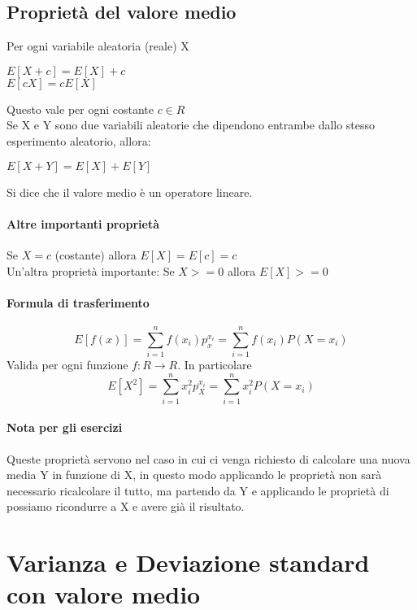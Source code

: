 \subsection{Proprietà del valore medio}
Per ogni variabile aleatoria (reale) X
\begin{center}
    $E[X + c] = E[X] + c$
    \\$E[cX] = c E[X]$
\end{center}
Questo vale per ogni costante $c \in R$
\\ Se X e Y sono due variabili aleatorie che dipendono entrambe dallo
stesso esperimento aleatorio, allora:
\begin{center}
    $E[X+Y] = E[X] + E[Y]$
\end{center}
Si dice che il valore medio è un operatore lineare.
\paragraph{Altre importanti proprietà} Se $X = c$ (costante) allora
$E[X] = E[c] = c$
\\ Un'altra proprietà importante: Se $X >= 0$ allora $E[X] >= 0$
\paragraph{Formula di trasferimento} 

\begin{equation}
    E[f(x)] = \sum_{i = 1}^{n} f(x_i)p_x^{x_i}
= \sum_{i = 1}^{n}f(x_i)P(X = x_i)
\end{equation}
Valida per ogni funzione $f:R \to R$. In particolare
\begin{equation}
    E[X^2] = \sum_{i = 1}^{n} x_i^2 p_X^{x_i} = \sum_{i = 1}^{n} x_i^2P(X=x_i)
\end{equation}

\paragraph*{Nota per gli esercizi} Queste proprietà servono nel caso in cui ci venga
richiesto di calcolare una nuova media Y in funzione di X, in questo modo applicando
le proprietà non sarà necessario ricalcolare il tutto, ma partendo da Y e applicando
le proprietà di possiamo ricondurre a X e avere già il risultato.

\section{Varianza e Deviazione standard con valore medio}
